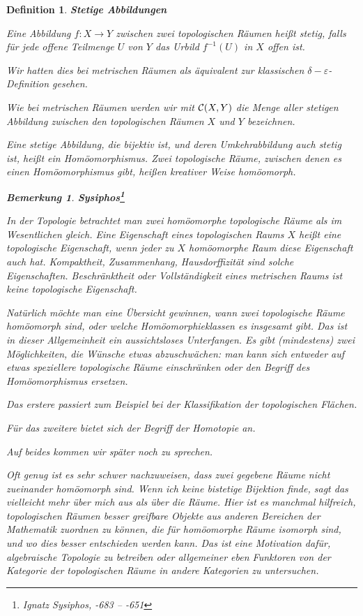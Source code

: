 \documentclass[12pt]{scrbook}   %
\newtheorem{bemX}[alles]{Bemerkung}
\newenvironment{bem}[1]{\begin{bemX}{\bf #1}\par\rm}{\end{bemX}}
\newtheorem{definiX}[alles]{Definition}
\newenvironment{defini}[1]{\begin{definiX}{\bf #1}\par\rm}{\end{definiX}}
\begin{document}
\begin{defini} {\bf Stetige Abbildungen}

{\rm Eine Abbildung $f:X\longrightarrow Y$ zwischen zwei topologischen Räumen
heißt {\it stetig}, falls für jede offene Teilmenge $U$
von $Y$ das Urbild $f^{-1}(U)$ in $X$ offen ist.

Wir hatten dies bei metrischen Räumen als äquivalent zur klassischen 
$\delta-\varepsilon$-Definition gesehen.

Wie bei metrischen Räumen werden wir mit ${\cal C}(X,Y)$ die Menge aller 
stetigen Abbildung zwischen den topologischen Räumen $X$ und $Y$ bezeichnen.

Eine stetige Abbildung, die bijektiv ist, und deren Umkehrabbildung auch
stetig ist, heißt ein {\it Homöomorphismus}. Zwei topologische Räume,
zwischen denen es einen Homöomorphismus gibt, heißen kreativer Weise
{\it homöomorph}.
}

\begin{bem}{Sysiphos\footnote{Ignatz Sysiphos, -683 -- -651}}
In der Topologie betrachtet man zwei homöomorphe topologische Räume 
als
im Wesentlichen gleich. Eine Eigenschaft eines topologischen Raums $X$ 
heißt eine {\it topologische Eigenschaft}, wenn jeder zu $X$ homöomorphe
Raum diese Eigenschaft auch hat. Kompaktheit, Zusammenhang, Hausdorffizität
sind solche Eigenschaften. Beschränktheit oder Vollständigkeit eines 
metrischen Raums ist keine topologische Eigenschaft.

Natürlich möchte man eine Übersicht gewinnen,
wann zwei topologische Räume homöomorph sind, oder welche 
Homöomorphieklassen es insgesamt gibt. Das ist in dieser Allgemeinheit ein
aussichtsloses Unterfangen. Es gibt (mindestens) zwei Möglichkeiten, die
Wünsche etwas abzuschwächen: man kann sich entweder auf etwas speziellere
topologische Räume einschränken oder den Begriff des Homöomorphismus
ersetzen.

Das erstere passiert zum Beispiel bei der Klassifikation der topologischen
Flächen.

Für das zweitere bietet sich der Begriff der Homotopie an.

Auf beides kommen wir später noch zu sprechen.

Oft genug ist es sehr schwer nachzuweisen, dass zwei gegebene Räume nicht 
zueinander homöomorph sind. Wenn ich keine bistetige Bijektion finde, sagt 
das vielleicht mehr über mich aus als über die Räume. Hier ist es 
manchmal hilfreich, topologischen Räumen besser greifbare Objekte aus anderen
Bereichen der Mathematik zuordnen zu können, die für homöomorphe Räume 
isomorph sind, und wo dies besser entschieden werden kann. Das ist eine 
Motivation dafür, algebraische Topologie zu betreiben oder allgemeiner
eben Funktoren von der Kategorie der topologischen Räume in andere
Kategorien zu untersuchen. 

\end{bem}
\end{defini}
\end{document}
